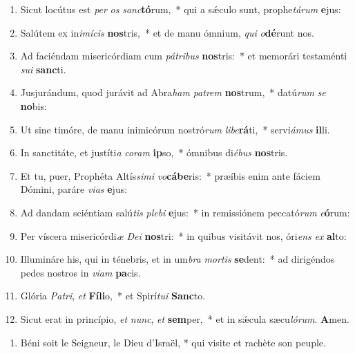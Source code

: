 \documentclass[twoside]{article}
\begin{document}
\begin{paracol}[1]{2}
\begin{enumerate}[wide, itemsep=0mm, labelwidth=!, labelindent=0pt, label=\color{gregoriocolor}\theenumi]
\item Sicut locútus est \textit{per} \textit{os} \textit{sanc}\textbf{tó}rum,~* qui a sǽculo sunt, prophe\textit{tá}\textit{rum} \textbf{e}jus:

\item Salútem ex in\textit{i}\textit{mí}\textit{cis} \textbf{nos}tris,~* et de manu ómnium, \textit{qui} \textit{o}\textbf{dé}runt nos.

\item Ad faciéndam misericórdiam cum \textit{pá}\textit{tri}\textit{bus} \textbf{nos}tris:~* et memorári testaménti \textit{su}\textit{i} \textbf{sanc}ti.

\item Jusjurándum, quod jurávit ad Abra\textit{ham} \textit{pa}\textit{trem} \textbf{nos}trum,~* datú\textit{rum} \textit{se} \textbf{no}bis:

\item Ut sine timóre, de manu inimicórum nostró\textit{rum} \textit{li}\textit{be}\textbf{rá}ti,~* servi\textit{á}\textit{mus} \textbf{il}li.

\item In sanctitáte, et justíti\textit{a} \textit{co}\textit{ram} \textbf{ip}so,~* ómnibus di\textit{é}\textit{bus} \textbf{nos}tris.

\item Et tu, puer, Prophéta Altís\textit{si}\textit{mi} \textit{vo}\textbf{cá}\textbf{be}ris:~* præíbis enim ante fáciem Dómini, paráre \textit{vi}\textit{as} \textbf{e}jus:

\item Ad dandam sciéntiam salú\textit{tis} \textit{ple}\textit{bi} \textbf{e}jus:~* in remissiónem peccató\textit{rum} \textit{e}\textbf{ó}rum:

\item Per víscera misericórdi\textit{æ} \textit{De}\textit{i} \textbf{nos}tri:~* in quibus visitávit nos, óri\textit{ens} \textit{ex} \textbf{al}to:

\item Illumináre his, qui in ténebris, et in um\textit{bra} \textit{mor}\textit{tis} \textbf{se}dent:~* ad dirigéndos pedes nostros in \textit{vi}\textit{am} \textbf{pa}cis.

\item Glória \textit{Pa}\textit{tri}, \textit{et} \textbf{Fí}\textbf{li}o,~* et Spirí\textit{tu}\textit{i} \textbf{Sanc}to.

\item Sicut erat in princípio, \textit{et} \textit{nunc}, \textit{et} \textbf{sem}per,~* et in sǽcula sæcu\textit{ló}\textit{rum}. \textbf{A}men.
\end{enumerate}
\switchcolumn
\begin{enumerate}[wide, itemsep=0mm, labelwidth=!, labelindent=0pt, label=\color{gregoriocolor}\theenumi]
\item Béni soit le Seigneur, le Dieu d'Israël, *
qui visite et rachète son peuple.


\end{enumerate}
\end{paracol}
\end{document}
